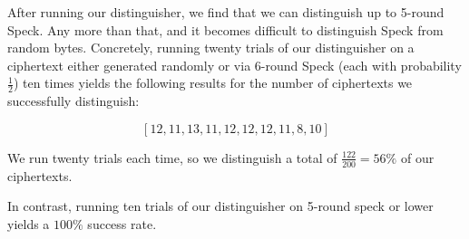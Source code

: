 \documentclass[11pt]{article}
\begin{document}
After running our distinguisher, we find that we can distinguish up to 5-round Speck. Any more than that, and it becomes difficult to distinguish Speck from random bytes. Concretely, running twenty trials of our distinguisher on a ciphertext either generated randomly or via 6-round Speck (each with probability $\frac{1}{2}$) ten times yields the following results for the number of ciphertexts we successfully distinguish:

$$[12, 11, 13, 11, 12, 12, 12, 11, 8, 10]$$

We run twenty trials each time, so we distinguish a total of $\frac{122}{200} = 56\%$ of our ciphertexts.

In contrast, running ten trials of our distinguisher on 5-round speck or lower yields a $100\%$ success rate.
\end{document}
